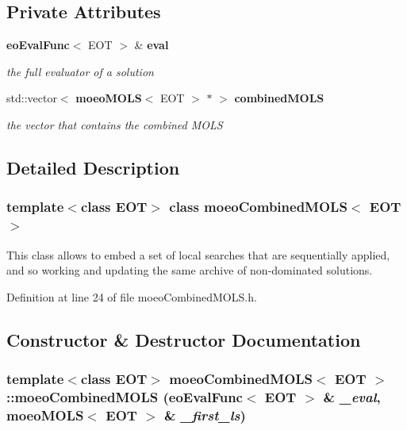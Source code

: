 \subsection*{Private Attributes}
\begin{CompactItemize}
\item 
{\bf eo\-Eval\-Func}$<$ EOT $>$ \& {\bf eval}\label{classmoeoCombinedMOLS_b2c0866a1808022bd3a9dac89e528a01}

\begin{CompactList}\small\item\em the full evaluator of a solution \item\end{CompactList}\item 
std::vector$<$ {\bf moeo\-MOLS}$<$ EOT $>$ $\ast$ $>$ {\bf combined\-MOLS}\label{classmoeoCombinedMOLS_a5ccc182c0d61421fc524c2da3671099}

\begin{CompactList}\small\item\em the vector that contains the combined MOLS \item\end{CompactList}\end{CompactItemize}


\subsection{Detailed Description}
\subsubsection*{template$<$class EOT$>$ class moeo\-Combined\-MOLS$<$ EOT $>$}

This class allows to embed a set of local searches that are sequentially applied, and so working and updating the same archive of non-dominated solutions. 



Definition at line 24 of file moeo\-Combined\-MOLS.h.

\subsection{Constructor \& Destructor Documentation}
\subsubsection{\setlength{\rightskip}{0pt plus 5cm}template$<$class EOT$>$ {\bf moeo\-Combined\-MOLS}$<$ EOT $>$::{\bf moeo\-Combined\-MOLS} ({\bf eo\-Eval\-Func}$<$ EOT $>$ \& {\em \_\-eval}, {\bf moeo\-MOLS}$<$ EOT $>$ \& {\em \_\-first\_\-ls})\hspace{0.3cm}{\tt  [inline]}}\label{classmoeoCombinedMOLS_9305380cd8f5a4d85ef603fa85c1860b}


